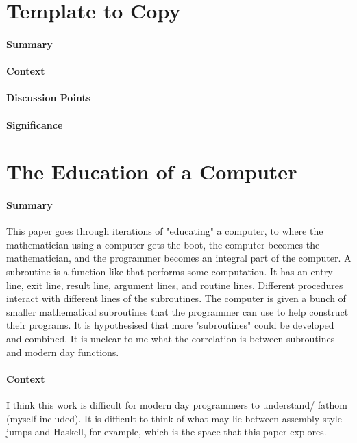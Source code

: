 \newpage

\section {Template to Copy}

\paragraph{\textbf{Summary}}
\paragraph{\textbf{Context}}
\paragraph{\textbf{Discussion Points}}
\paragraph{\textbf{Significance}}

\section {The Education of a Computer \cite{hopper1952education}}

\paragraph{\textbf{Summary}}
This paper goes through iterations of "educating" a computer, to where the
mathematician using a computer gets the boot, the computer becomes the
mathematician, and the programmer becomes an integral part of the computer. A
subroutine is a function-like that performs some computation. It has an entry
line, exit line, result line, argument lines, and routine lines. Different
procedures interact with different lines of the subroutines. The computer is
given a bunch of smaller mathematical subroutines that the programmer can use to
help construct their programs. It is hypothesised that more "subroutines" could
be developed and combined. It is unclear to me what the correlation is between
subroutines and modern day functions.
\paragraph{\textbf{Context}}
I think this work is difficult for modern day programmers to understand/ fathom
(myself included). It is difficult to think of what may lie between
assembly-style jumps and Haskell, for example, which is the space that this
paper explores.
